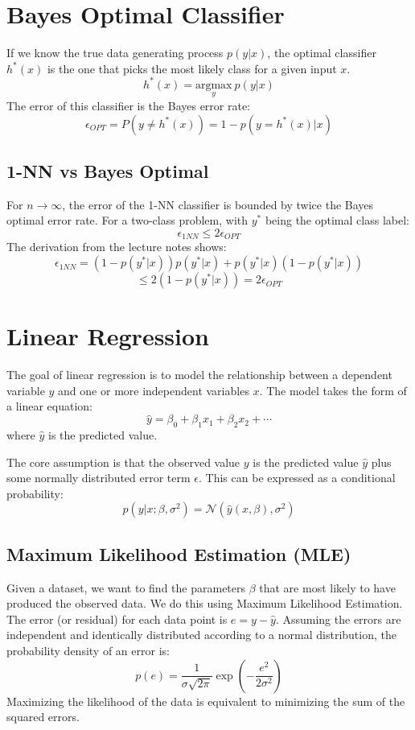 \documentclass{article}
\begin{document}
\begin{multicols}{2}
	\section{Bayes Optimal Classifier}
	If we know the true data generating process $p(y|x)$, the optimal classifier $h^*(x)$ is the one that picks the most likely class for a given input $x$.
	$$ h^*(x) = \underset{y}{\text{argmax}} \ p(y|x) $$
	The error of this classifier is the Bayes error rate:
	$$ \epsilon_{OPT} = P(y \neq h^*(x)) = 1 - p(y=h^*(x)|x) $$

	\subsection{1-NN vs Bayes Optimal}
	For $n \rightarrow \infty$, the error of the 1-NN classifier is bounded by twice the Bayes optimal error rate.
	For a two-class problem, with $y^*$ being the optimal class label:
	$$ \epsilon_{1NN} \le 2\epsilon_{OPT} $$
	The derivation from the lecture notes shows:
	$$ \epsilon_{1NN} = (1-p(y^*|x))p(y^*|x) + p(y^*|x)(1-p(y^*|x)) $$
	$$\le 2(1-p(y^*|x)) = 2\epsilon_{OPT} $$


	\section{Linear Regression}

	The goal of linear regression is to model the relationship between a dependent variable $y$ and one or more independent variables $x$.
	The model takes the form of a linear equation:
	$$ \hat{y} = \beta_0 + \beta_1 x_1 + \beta_2 x_2 + \cdots $$
	where $\hat{y}$ is the predicted value.

	The core assumption is that the observed value $y$ is the predicted value $\hat{y}$ plus some normally distributed error term $\epsilon$. This can be expressed as a conditional probability:
	$$ p(y|x; \beta, \sigma^2) = \mathcal{N}(\hat{y}(x, \beta), \sigma^2) $$

	\subsection{Maximum Likelihood Estimation (MLE)}
	Given a dataset, we want to find the parameters $\beta$ that are most likely to have produced the observed data. We do this using Maximum Likelihood Estimation. The error (or residual) for each data point is $e = y - \hat{y}$. Assuming the errors are independent and identically distributed according to a normal distribution, the probability density of an error is:
	$$ p(e) = \frac{1}{\sigma\sqrt{2\pi}} \exp\left(-\frac{e^2}{2\sigma^2}\right) $$
	Maximizing the likelihood of the data is equivalent to minimizing the sum of the squared errors.


\end{multicols}
\end{document}
